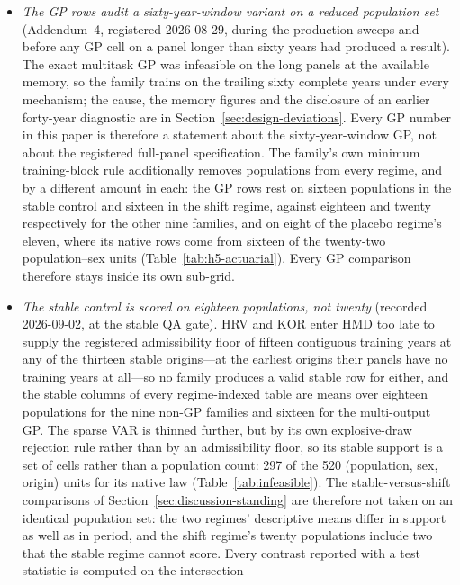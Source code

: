 \begin{itemize}
\item \emph{The GP rows audit a sixty-year-window variant on a reduced
  population set} (Addendum~4, registered 2026-08-29, during the production
  sweeps and before any GP cell on a panel longer than sixty years had
  produced a result). The exact multitask GP was infeasible on the long
  panels at the available memory, so the family trains on the trailing
  sixty complete years under every mechanism; the cause, the memory
  figures and the disclosure of an earlier forty-year diagnostic are in
  Section~\ref{sec:design-deviations}. Every GP number in this paper is
  therefore a statement about the sixty-year-window GP, not about the
  registered full-panel specification. The family's own minimum
  training-block rule additionally removes populations from every regime,
  and by a different amount in each: the GP rows rest on sixteen
  populations in the stable control and sixteen in the shift regime,
  against eighteen and twenty respectively for the other nine families,
  and on eight of the placebo regime's eleven, where its native rows come
  from sixteen of the twenty-two population--sex units
  (Table~\ref{tab:h5-actuarial}). Every GP comparison therefore stays
  inside its own sub-grid.
\item \emph{The stable control is scored on eighteen populations, not
  twenty} (recorded 2026-09-02, at the stable QA gate). HRV and KOR enter
  HMD too late to supply the registered admissibility floor of fifteen
  contiguous training years at any of the thirteen stable origins---at the
  earliest origins their panels have no training years at all---so no
  family produces a valid stable row for either, and the stable columns of
  every regime-indexed table are means over eighteen populations for the
  nine non-GP families and sixteen for the multi-output GP. The sparse
  VAR is thinned further, but by its own explosive-draw rejection rule
  rather than by an admissibility floor, so its stable support is a set of
  cells rather than a population count: 297 of the 520 (population, sex,
  origin) units for its native law (Table~\ref{tab:infeasible}). The
  stable-versus-shift comparisons of
  Section~\ref{sec:discussion-standing} are therefore not
  taken on an identical population set: the two regimes' descriptive means
  differ in support as well as in period, and the shift regime's twenty
  populations include two that the stable regime cannot score. Every
  contrast reported with a test statistic is computed on the intersection

\end{itemize}
